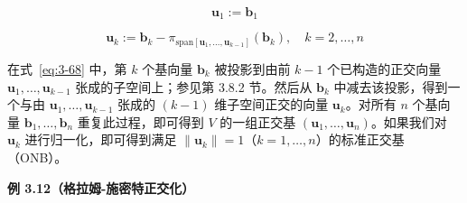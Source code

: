 \begin{equation}
\boldsymbol{u}_1 := \boldsymbol{b}_1
\tag{3.67}\label{eq:3-67}
\end{equation}

\begin{equation}
\boldsymbol{u}_k := \boldsymbol{b}_k - \pi_{\text{span}[\boldsymbol{u}_1, \ldots, \boldsymbol{u}_{k-1}]}(\boldsymbol{b}_k), \quad k = 2, \ldots, n
\tag{3.68}\label{eq:3-68}
\end{equation}

在式~\eqref{eq:3-68} 中，第 $ k $ 个基向量 $ \boldsymbol{b}_k $ 被投影到由前 $ k-1 $ 个已构造的正交向量 $ \boldsymbol{u}_1, \ldots, \boldsymbol{u}_{k-1} $ 张成的子空间上；参见第 3.8.2 节。然后从 $ \boldsymbol{b}_k $ 中减去该投影，得到一个与由 $ \boldsymbol{u}_1, \ldots, \boldsymbol{u}_{k-1} $ 张成的 $ (k-1) $ 维子空间正交的向量 $ \boldsymbol{u}_k $。对所有 $ n $ 个基向量 $ \boldsymbol{b}_1, \ldots, \boldsymbol{b}_n $ 重复此过程，即可得到 $ V $ 的一组正交基 $ (\boldsymbol{u}_1, \ldots, \boldsymbol{u}_n) $。如果我们对 $ \boldsymbol{u}_k $ 进行归一化，即可得到满足 $ \|\boldsymbol{u}_k\| = 1 $（$ k = 1, \ldots, n $）的标准正交基（ONB）。

\begin{notebox}
\textbf{例 3.12（格拉姆-施密特正交化）}
\end{notebox}


